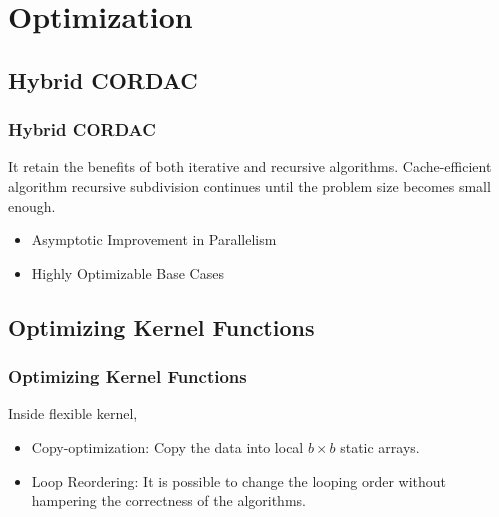\section{Optimization}

\subsection{Hybrid CORDAC}
\begin{frame}
    \frametitle{Hybrid CORDAC}
    	It retain the benefits of both iterative and recursive algorithms.
		Cache-efficient algorithm recursive subdivision continues until 
		the problem size becomes small enough.
	\begin{itemize}
		\item Asymptotic Improvement in Parallelism
		\item Highly Optimizable Base Cases
	\end{itemize}
\end{frame}

\subsection{Optimizing Kernel Functions}
\begin{frame}
    \frametitle{Optimizing Kernel Functions}
	Inside flexible kernel, 
	\begin{itemize}
		\item Copy-optimization: Copy the data into local $b \times b$ 
			static arrays.
		\item Loop Reordering: It is possible to change
			the looping order without hampering the correctness of the algorithms.
	\end{itemize}
\end{frame}

